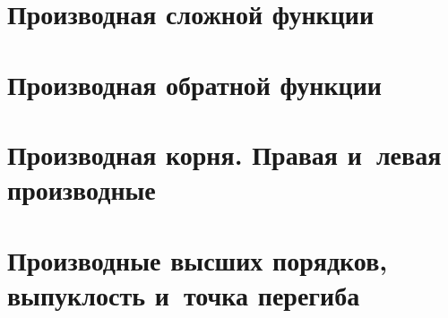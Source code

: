 \documentclass[14pt, oneside]{extbook}
\begin{document}
\section{Производная сложной функции}

\section{Производная обратной функции}

\section{Производная корня. Правая и~левая производные}

\section{Производные высших порядков, выпуклость и~точка перегиба}
\end{document}

